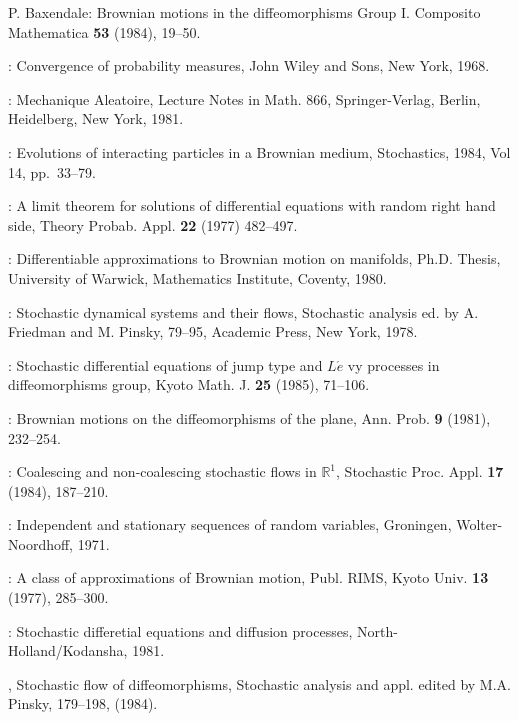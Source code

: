 \begin{thebibliography}{99}\pageoriginale
{} {P. Baxendale}:  Brownian motions in the diffeomorphisms
  Group I. Composito Mathematica \textbf{53} (1984), 19--50. 

:  Convergence of probability measures,
  John Wiley and Sons, New York, 1968. 

:  Mechanique Aleatoire, Lecture Notes in
  Math. 866, Springer-Verlag, Berlin, Heidelberg, New York, 1981. 

:  Evolutions of interacting particles in a
  Brownian medium, Stochastics, 1984, Vol 14, pp.~33--79. 

:  A limit theorem for solutions of
  differential equations with random right hand side, Theory
  Probab. Appl. \textbf{22} (1977) 482--497. 

:  Differentiable approximations to Brownian
  motion on manifolds, Ph.D. Thesis, University of Warwick,
  Mathematics Institute, Coventy, 1980. 

:  Stochastic dynamical systems and their
  flows, Stochastic analysis ed. by A. Friedman and M. Pinsky,
  79--95, Academic Press, New York, 1978. 

:  Stochastic differential
  equations of jump type and $L\acute{e}$ vy processes in
  diffeomorphisms group, Kyoto Math. J. \textbf{25} (1985), 71--106. 

:  Brownian motions on the diffeomorphisms of
  the plane, Ann. Prob. \textbf{9} (1981), 232--254. 

:  Coalescing and non-coalescing stochastic
  flows in $\mathbb{R}^1$, Stochastic Proc. Appl. \textbf{17} (1984),
  187--210. 

:  Independent and
  stationary sequences of random variables, Groningen,
  Wolter-Noordhoff, 1971. 

:  A class of
  approximations of Brownian motion, Publ. RIMS, Kyoto Univ. 
  \textbf{13} (1977), 285--300. 

:  Stochastic differetial
  equations and diffusion processes, North-Holland/Kodansha, 1981. 

, Stochastic flow of
  diffeomorphisms, Stochastic analysis and appl. edited by
  M.A. Pinsky, 179--198, (1984). 


\end{thebibliography}
